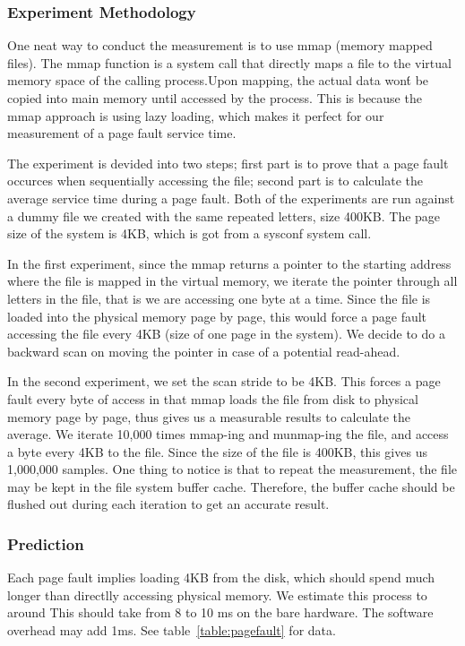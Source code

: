 \documentclass{article} %
\begin{document}
\subsubsection{Experiment Methodology}
One neat way to conduct the measurement is to use mmap (memory mapped files). The mmap function is a system call that directly maps a file to the virtual memory space of the calling process.Upon mapping, the actual data won\'t be copied into main memory until accessed by the process. This is because the mmap approach is using lazy loading, which makes it perfect for our measurement of a page fault service time. 

The experiment is devided into two steps; first part is to prove that a page fault occurces when sequentially accessing the file; second part is to calculate the average service time during a page fault.
Both of the experiments are run against a dummy file we created with the same repeated letters, size 400KB. The page size of the system is 4KB, which is got from a sysconf system call.

In the first experiment, since the mmap returns a pointer to the starting address where the file is mapped in the virtual memory, we iterate the pointer through all letters in the file, that is we are accessing one byte at a time. Since the file is loaded into the physical memory page by page, this would force a page fault accessing the file every 4KB (size of one page in the system). We decide to do a backward scan on moving the pointer in case of a potential read-ahead.

In the second experiment, we set the scan stride to be 4KB. This forces a page fault every byte of access in that mmap loads the file from disk to physical memory page by page, thus gives us a measurable results to calculate the average. 
We iterate 10,000 times mmap-ing and munmap-ing the file, and access a byte every 4KB to the file. Since the size of the file is 400KB, this gives us 1,000,000 samples. 
One thing to notice is that to repeat the measurement,  the file may be kept in the file system buffer cache. Therefore, the buffer cache should be flushed out during each iteration to get an accurate result.

\subsubsection{Prediction}
Each page fault implies loading 4KB from the disk, which should spend much longer than directlly accessing physical memory. We estimate this process to around This should take from 8 to 10 ms on the bare hardware. The software overhead may add 1ms. 
See table~\ref{table:pagefault} for data.
\end{document}
